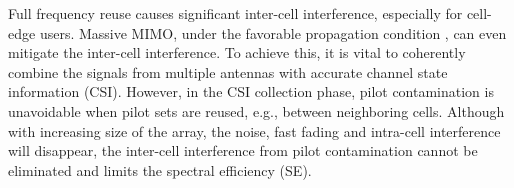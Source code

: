 Full frequency reuse causes significant inter-cell interference, especially for cell-edge users. Massive MIMO, under the favorable propagation condition \cite{ngo2014aspects}, can even mitigate the inter-cell interference. %
To achieve this, it is vital to coherently combine the signals from multiple antennas with accurate channel state information (CSI). However, in the CSI collection phase, pilot contamination is unavoidable when pilot sets are reused, e.g., between neighboring cells. Although with increasing size of the array, the %
noise, fast fading and intra-cell interference will disappear, %
the inter-cell interference from pilot contamination cannot be eliminated and limits the spectral efficiency (SE)\cite{marzetta2010noncooperative,bjornson2017massive,jose2011pilot}.

